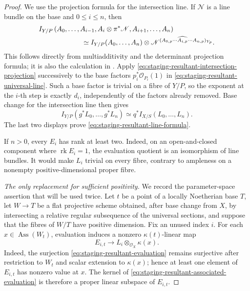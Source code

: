 \begin{proof}
We use the projection formula for the intersection line.  If
\(\mathscr N\) is a line bundle on the base and \(0\leq i\leq n\), then
\begin{align}
 &I_{Y/P}
 \left(
  A_0,\ldots,A_{i-1},
  A_i\otimes\pi^*\mathscr N,
  A_{i+1},\ldots,A_n
 \right)
 \notag\\
 &\hspace{22mm}\simeq
 I_{Y/P}(A_0,\ldots,A_n)
 \otimes
 \mathscr N^{
  (A_{0,p}\cdots\widehat{A_{i,p}}\cdots A_{n,p})_{Y_p}
 } .
 \label{eq:staging-resultant-intersection-projection}
\end{align}
This follows directly from multiadditivity and the determinant
projection formula; it is also the calculation in
\cite[Lemma~6.3.1]{Ducrot05Cube}.  Apply
\eqref{eq:staging-resultant-intersection-projection} successively to the
base factors \(p_i^*\mathcal O_{P_i}(1)\) in
\eqref{eq:staging-resultant-universal-line}.  Such a base factor is
trivial on a fibre of \(Y/P\), so the exponent at the \(i\)-th step is
exactly \(d_i\), independently of the factors already removed.  Base
change for the intersection line then gives
\[
 I_{Y/P}(g^*L_0,\ldots,g^*L_n)
 \simeq q^*I_{X/S}(L_0,\ldots,L_n).
\]
The last two displays prove
\eqref{eq:staging-resultant-line-formula}.

If \(n>0\), every \(E_i\) has rank at least two.  Indeed, on an
open-and-closed component where \(\operatorname{rk}E_i=1\), the evaluation
quotient is an isomorphism of line bundles.  It would make \(L_i\) trivial
on every fibre, contrary to ampleness on a nonempty positive-dimensional
proper fibre.

\medskip
\noindent\emph{The only replacement for sufficient positivity.}
We record the parameter-space assertion that will be used twice.  Let
\(t\) be a point of a locally Noetherian base \(T\), let
\(W\to T\) be a flat projective scheme obtained, after base change from
\(X\), by intersecting a relative regular subsequence of the universal
sections, and suppose that
the fibres of \(W/T\) have positive dimension.  Fix an unused index \(i\).
For each \(x\in\operatorname{Ass}(W_t)\), evaluation induces a nonzero
\(\kappa(t)\)-linear map
\begin{equation}\label{eq:staging-resultant-associated-evaluation}
 E_{i,t}\longrightarrow
 L_i\otimes_{\mathcal O_X}\kappa(x).
\end{equation}
Indeed, the surjection \eqref{eq:staging-resultant-evaluation} remains
surjective after restriction to \(W_t\) and scalar extension to
\(\kappa(x)\); hence at least one element of \(E_{i,t}\) has nonzero value
at \(x\).  The kernel of
\eqref{eq:staging-resultant-associated-evaluation} is therefore a proper
linear subspace of \(E_{i,t}\).


\end{proof}
